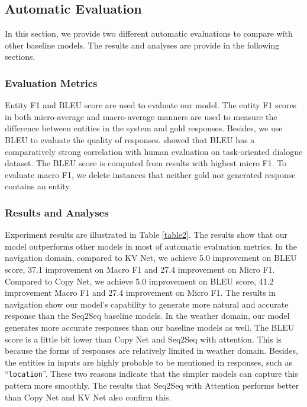 \documentclass[11pt]{article}
\begin{document}
\subsection{Automatic Evaluation}
In this section, we provide two different automatic evaluations to compare with other baseline models. The results and analyses are provide in the following sections.

\subsubsection{Evaluation Metrics}

Entity F1 and BLEU score are used to evaluate our model.
	The entity F1 scores in both micro-average and macro-average manners are used to measure the difference between entities in the system and gold responses. Besides, we use BLEU to evaluate the quality of responses.  showed that BLEU has a comparatively strong correlation with human evaluation on task-oriented dialogue dataset. The BLEU score is computed from results with highest micro F1. To evaluate macro F1, we delete instances that neither gold nor generated response contains an entity.

\subsubsection{Results and Analyses}
Experiment results are illustrated in Table \ref{table2}. 
The results show that our model outperforms other models in most of automatic evaluation metrics. 
In the navigation domain, compared to KV Net, we achieve 5.0 improvement on BLEU score, 37.1 improvement on Macro F1 and 27.4 improvement on Micro F1. 
Compared to Copy Net, we achieve 5.0 improvement on BLEU score, 41.2 improvement Macro F1 and 27.4 improvement on Micro F1. 
The results in navigation show our model's capability to generate more natural and accurate response than the Seq2Seq baseline models. 
In the weather domain, our model generates more accurate responses than our baseline models as well. 
The BLEU score is a little bit lower than Copy Net and Seq2Seq with attention. This is because the forms of responses are relatively limited in weather domain.
Besides, the entities in inputs are highly probable to be mentioned in responses, such as ``\texttt{location}''. These two reasons indicate that the simpler models can capture this pattern more smoothly.
The results that Seq2Seq with Attention performs better than Copy Net and KV Net also confirm this.
\end{document}
